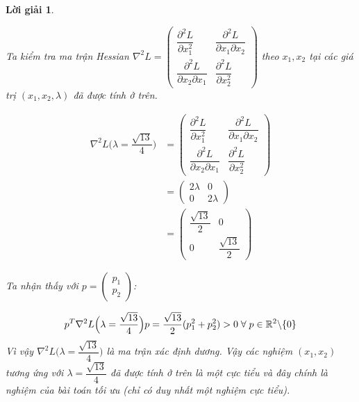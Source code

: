 \documentclass[14pt, a4paper]{article}
\theoremstyle{sltheorem}
\theoremstyle{soltheorem}
\newtheorem*{loigiai}{Lời giải}
\begin{document}
\begin{loigiai}
\begin{itemize}
            Ta kiểm tra ma trận Hessian $\nabla^2 L= \begin{pmatrix} \dfrac{\partial^2 L}{\partial x_1^2} & \dfrac{\partial^2 L}{\partial x_1 \partial x_2} \\ \dfrac{\partial^2 L}{\partial x_2 \partial x_1} & \dfrac{\partial^2 L}{\partial x_2^2} \end{pmatrix} $ theo $x_1, x_2$ tại các giá trị $(x_1, x_2, \lambda)$ đã được tính ở trên.

            \begin{equation*}
                \begin{aligned}
                    \nabla^2 L \Big( \lambda = \dfrac{\sqrt{13}}{4} \Big) &= \begin{pmatrix} \dfrac{\partial^2 L}{\partial x_1^2} & \dfrac{\partial^2 L}{\partial x_1 \partial x_2} \\ \dfrac{\partial^2 L}{\partial x_2 \partial x_1} & \dfrac{\partial^2 L}{\partial x_2^2} \end{pmatrix} \\
                    &= \begin{pmatrix} 2\lambda & 0 \\ 0 & 2\lambda \end{pmatrix} \\
                    &= \begin{pmatrix} \dfrac{\sqrt{13}}{2} & 0 \\ 0 & \dfrac{\sqrt{13}}{2} \end{pmatrix}
                \end{aligned}
            \end{equation*}

            Ta nhận thấy với $p=\begin{pmatrix} p_1 \\ p_2 \end{pmatrix}$:
            
            \begin{equation*}
                p^T \nabla^2 L \Big( \lambda = \dfrac{\sqrt{13}}{4} \Big) p=\dfrac{\sqrt{13}}{2} (p_1^2 + p_2^2) > 0 \thickspace \forall \thickspace p \in \mathbb{R}^2 \backslash \lbrace 0 \rbrace
            \end{equation*}
            Vì vậy $\nabla^2 L \Big( \lambda = \dfrac{\sqrt{13}}{4} \Big)$ là ma trận xác định dương. Vậy các nghiệm $(x_1, x_2)$ tương ứng với $\lambda = \dfrac{\sqrt{13}}{4}$ đã được tính ở trên là một cực tiểu và đây chính là nghiệm của bài toán tối ưu (chỉ có duy nhất một nghiệm cực tiểu).


\end{itemize}
\end{loigiai}
\end{document}
